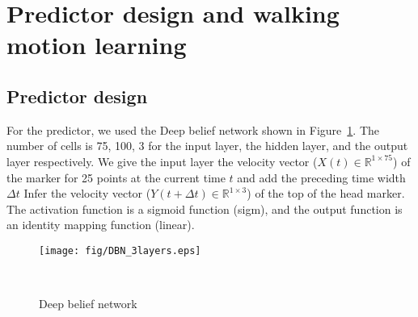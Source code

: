 \documentclass{sigchi}
\begin{document}
\section{Predictor design and walking motion learning}%

\subsection{Predictor design}


For the predictor, we used the Deep belief network shown in Figure~\ref{fig:dbn}. The number of cells is 75, 100, 3 for the input layer, the hidden layer, and the output layer respectively. We give the input layer the velocity vector ($ X (t) \in \mathbb {R}^{1 \times 75} $) of the marker for 25 points at the current time $ t $ and add the preceding time width $ \Delta t $ Infer the velocity vector ($ Y (t + \Delta t) \in \mathbb {R} ^{1 \times 3} $) of the top of the head marker. The activation function is a sigmoid function (sigm), and the output function is an identity mapping function (linear).


\begin{figure}
\centering
  \texttt{[image: fig/DBN\_3layers.eps]}
  \caption{Deep belief network}~\label{fig:dbn}
\end{figure}
\end{document}
